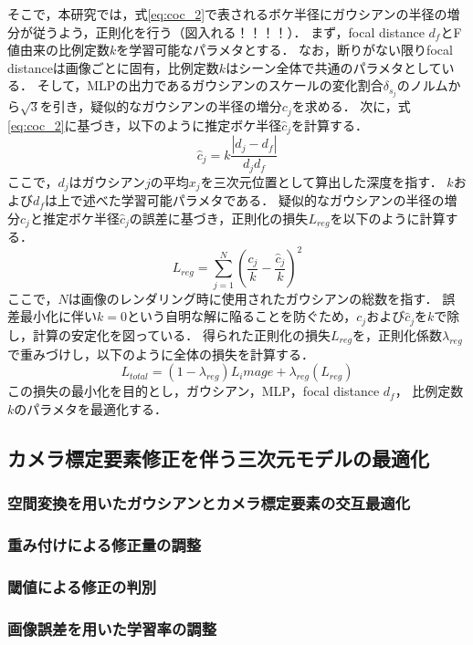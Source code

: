 そこで，本研究では，式\ref{eq:coc_2}で表されるボケ半径にガウシアンの半径の増分が従うよう，正則化を行う（図入れる！！！！）．
まず，focal distance $d_f$とF値由来の比例定数$k$を学習可能なパラメタとする．
なお，断りがない限りfocal distanceは画像ごとに固有，比例定数$k$はシーン全体で共通のパラメタとしている．
そして，MLPの出力であるガウシアンのスケールの変化割合$\delta_{s_j}$のノルムから$\sqrt{3}$を引き，疑似的なガウシアンの半径の増分$c_j$を求める．
次に，式\ref{eq:coc_2}に基づき，以下のように推定ボケ半径$\hat{c}_j$を計算する．
\begin{equation}
	\hat{c}_j = k \frac{\left|d_j-d_f\right|}{d_jd_f}
	\label{eq:loss_reg}
\end{equation}
ここで，$d_j$はガウシアン$j$の平均$x_j$を三次元位置として算出した深度を指す．
$k$および$d_f$は上で述べた学習可能パラメタである．
疑似的なガウシアンの半径の増分$c_j$と推定ボケ半径$\hat{c}_j$の誤差に基づき，正則化の損失$L_{reg}$を以下のように計算する．
\begin{equation}
	L_{reg}=\sum_{j=1}^N\left(\frac{c_j}{k}-\frac{\hat{c}_j}{k}\right)^2
	\label{eq:loss_reg}
\end{equation}
ここで，$N$は画像のレンダリング時に使用されたガウシアンの総数を指す．
誤差最小化に伴い$k=0$という自明な解に陥ることを防ぐため，$c_j$および$\hat{c}_j$を$k$で除し，計算の安定化を図っている．
得られた正則化の損失$L_{reg}$を，正則化係数$\lambda_{reg}$で重みづけし，以下のように全体の損失を計算する．
\begin{equation}
	L_{total} = (1-\lambda_{reg})L_image + \lambda_{reg}(L_{reg})
\end{equation}
この損失の最小化を目的とし，ガウシアン，MLP，focal distance $d_f$， 比例定数$k$のパラメタを最適化する．

\subsection{カメラ標定要素修正を伴う三次元モデルの最適化}\label{subsec:pose_correction}
\subsubsection{空間変換を用いたガウシアンとカメラ標定要素の交互最適化}\label{subsubsec:sequential_optimization}
\subsubsection{重み付けによる修正量の調整}
\subsubsection*{閾値による修正の判別}
\subsubsection*{画像誤差を用いた学習率の調整}
\cite{3d_warping}